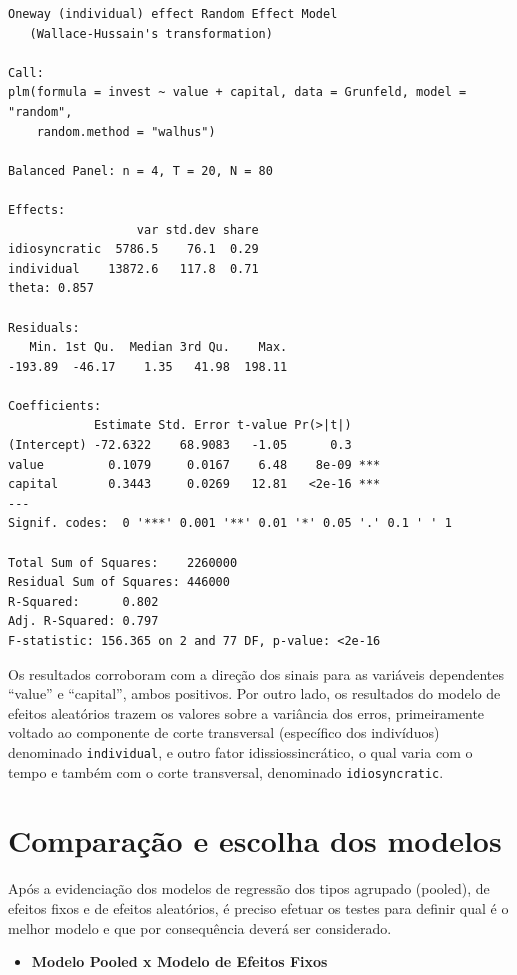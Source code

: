 \documentclass[12pt,brazil,oneside]{book}
\providecommand{\tightlist}{%
  \setlength{\itemsep}{0pt}\setlength{\parskip}{0pt}}
\begin{document}
\begin{verbatim}
Oneway (individual) effect Random Effect Model 
   (Wallace-Hussain's transformation)

Call:
plm(formula = invest ~ value + capital, data = Grunfeld, model = "random", 
    random.method = "walhus")

Balanced Panel: n = 4, T = 20, N = 80

Effects:
                  var std.dev share
idiosyncratic  5786.5    76.1  0.29
individual    13872.6   117.8  0.71
theta: 0.857

Residuals:
   Min. 1st Qu.  Median 3rd Qu.    Max. 
-193.89  -46.17    1.35   41.98  198.11 

Coefficients:
            Estimate Std. Error t-value Pr(>|t|)    
(Intercept) -72.6322    68.9083   -1.05      0.3    
value         0.1079     0.0167    6.48    8e-09 ***
capital       0.3443     0.0269   12.81   <2e-16 ***
---
Signif. codes:  0 '***' 0.001 '**' 0.01 '*' 0.05 '.' 0.1 ' ' 1

Total Sum of Squares:    2260000
Residual Sum of Squares: 446000
R-Squared:      0.802
Adj. R-Squared: 0.797
F-statistic: 156.365 on 2 and 77 DF, p-value: <2e-16
\end{verbatim}

Os resultados corroboram com a direção dos sinais para as variáveis
dependentes ``value'' e ``capital'', ambos positivos. Por outro lado, os
resultados do modelo de efeitos aleatórios trazem os valores sobre a
variância dos erros, primeiramente voltado ao componente de corte
transversal (específico dos indivíduos) denominado \texttt{individual},
e outro fator idissiossincrático, o qual varia com o tempo e também com
o corte transversal, denominado \texttt{idiosyncratic}.

\hypertarget{comparacao-e-escolha-dos-modelos}{%
\section{Comparação e escolha dos
modelos}\label{comparacao-e-escolha-dos-modelos}}

Após a evidenciação dos modelos de regressão dos tipos agrupado
(pooled), de efeitos fixos e de efeitos aleatórios, é preciso efetuar os
testes para definir qual é o melhor modelo e que por consequência deverá
ser considerado.

\begin{itemize}
\tightlist
\item
  \textbf{Modelo Pooled x Modelo de Efeitos Fixos}
\end{itemize}
\end{document}
